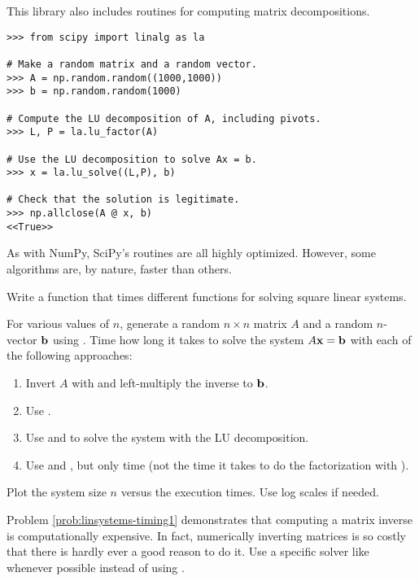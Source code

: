 This library also includes routines for computing matrix decompositions.

\begin{lstlisting}
>>> from scipy import linalg as la

# Make a random matrix and a random vector.
>>> A = np.random.random((1000,1000))
>>> b = np.random.random(1000)

# Compute the LU decomposition of A, including pivots.
>>> L, P = la.lu_factor(A)

# Use the LU decomposition to solve Ax = b.
>>> x = la.lu_solve((L,P), b)

# Check that the solution is legitimate.
>>> np.allclose(A @ x, b)
<<True>>
\end{lstlisting}

As with NumPy, SciPy's routines are all highly optimized.
However, some algorithms are, by nature, faster than others.

\begin{problem} %
Write a function that times different  functions for solving square linear systems.

For various values of $n$, generate a random $n \times n$ matrix $A$ and a random $n$-vector $\mathbf{b}$ using .
Time how long it takes to solve the system $A\mathbf{x} = \mathbf{b}$ with each of the following approaches:
%
\begin{enumerate}
\item Invert $A$ with  and left-multiply the inverse to $\mathbf{b}$.
\item Use .
\item Use  and  to solve the system with the LU decomposition.
\item Use  and , but only time  (not the time it takes to do the factorization with ).
\end{enumerate}
%
Plot the system size $n$ versus the execution times.
Use log scales if needed.
\label{prob:linsystems-timing1}
\end{problem}

\begin{warn}
Problem \ref{prob:linsystems-timing1} demonstrates that computing a matrix inverse is computationally expensive.
In fact, numerically inverting matrices is so costly that there is hardly ever a good reason to do it.
Use a specific solver like  whenever possible instead of using .
\end{warn}

